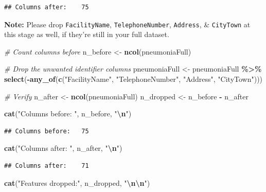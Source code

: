 \documentclass[
]{article}
\newenvironment{Shaded}{\begin{snugshade}}{\end{snugshade}}
\newcommand{\CommentTok}[1]{\textcolor[rgb]{0.56,0.35,0.01}{\textit{#1}}}
\newcommand{\FunctionTok}[1]{\textcolor[rgb]{0.13,0.29,0.53}{\textbf{#1}}}
\newcommand{\NormalTok}[1]{#1}
\newcommand{\OtherTok}[1]{\textcolor[rgb]{0.56,0.35,0.01}{#1}}
\newcommand{\SpecialCharTok}[1]{\textcolor[rgb]{0.81,0.36,0.00}{\textbf{#1}}}
\newcommand{\StringTok}[1]{\textcolor[rgb]{0.31,0.60,0.02}{#1}}
\begin{document}
\begin{verbatim}
## Columns after:    75
\end{verbatim}

\textbf{Note:} Please drop \texttt{FacilityName},
\texttt{TelephoneNumber}, \texttt{Address}, \& \texttt{CityTown} at this
stage as well, if they're still in your full dataset.

\begin{Shaded}
\begin{Highlighting}[]
\CommentTok{\# Count columns before}
\NormalTok{n\_before }\OtherTok{\textless{}{-}} \FunctionTok{ncol}\NormalTok{(pneumoniaFull)}

\CommentTok{\# Drop the unwanted identifier columns}
\NormalTok{pneumoniaFull }\OtherTok{\textless{}{-}}\NormalTok{ pneumoniaFull }\SpecialCharTok{\%\textgreater{}\%}
    \FunctionTok{select}\NormalTok{(}\SpecialCharTok{{-}}\FunctionTok{any\_of}\NormalTok{(}\FunctionTok{c}\NormalTok{(}\StringTok{"FacilityName"}\NormalTok{, }\StringTok{"TelephoneNumber"}\NormalTok{, }
                     \StringTok{"Address"}\NormalTok{, }\StringTok{"CityTown"}\NormalTok{)))}

\CommentTok{\# Verify}
\NormalTok{n\_after  }\OtherTok{\textless{}{-}} \FunctionTok{ncol}\NormalTok{(pneumoniaFull)}
\NormalTok{n\_dropped }\OtherTok{\textless{}{-}}\NormalTok{ n\_before }\SpecialCharTok{{-}}\NormalTok{ n\_after}

\FunctionTok{cat}\NormalTok{(}\StringTok{"Columns before:  "}\NormalTok{, n\_before, }\StringTok{"}\SpecialCharTok{\textbackslash{}n}\StringTok{"}\NormalTok{)}
\end{Highlighting}
\end{Shaded}

\begin{verbatim}
## Columns before:   75
\end{verbatim}

\begin{Shaded}
\begin{Highlighting}[]
\FunctionTok{cat}\NormalTok{(}\StringTok{"Columns after:   "}\NormalTok{, n\_after, }\StringTok{"}\SpecialCharTok{\textbackslash{}n}\StringTok{"}\NormalTok{)}
\end{Highlighting}
\end{Shaded}

\begin{verbatim}
## Columns after:    71
\end{verbatim}

\begin{Shaded}
\begin{Highlighting}[]
\FunctionTok{cat}\NormalTok{(}\StringTok{"Features dropped:"}\NormalTok{, n\_dropped, }\StringTok{"}\SpecialCharTok{\textbackslash{}n\textbackslash{}n}\StringTok{"}\NormalTok{)}
\end{Highlighting}
\end{Shaded}
\end{document}
